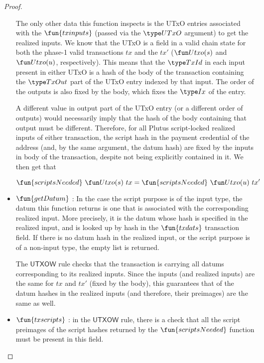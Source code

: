 \begin{property}
\begin{proof}
\begin{itemize}
      The only other data this function inspects is the UTxO entries associated
      with the $\fun{txinputs}$ (passed via the $\UTxO$ argument) to get the realized inputs.
      We know that the UTxO is a field in a valid chain state for both the phase-1 valid
      transactions $tx$ and
      the $tx'$ ($\Utxo(s)$ and $\Utxo(u)$, respectively). This means that the $\TxId$
      in each input present in either UTxO is a hash of the body of the transaction
      containing the $\TxOut$ part of the UTxO entry indexed by that input. The
      order of the outputs is also fixed by the body, which fixes the $\Ix$ of
      the entry.

      A different value in output part of the UTxO entry (or a different order of
      outputs) would necessarily imply
      that the hash of the body containing that output must be different.
      Therefore, for all Plutus script-locked realized inputs of either transaction,
      the script hash in the payment credential of the address
      (and, by the same argument, the datum hash) are fixed by the inputs in body of the
      transaction, despite not being explicitly contained in it. We then get that

      \[ \fun{scriptsNeeded}~\Utxo(s)~tx = \fun{scriptsNeeded}~\Utxo(u)~tx' \]

      \item $\fun{getDatum}$ : In the case the script purpose
      is of the input type, the datum this function returns is one that
      is associated with the corresponding realized input. More precisely, it is the datum whose
      hash is specified in the realized input, and is looked up by hash in the $\fun{txdats}$
      transaction field. If there is no datum hash in the realized input, or the script purpose
      is of a non-input type, the empty list is returned.

      The $\mathsf{UTXOW}$ rule checks that the transaction is carrying all datums corresponding
      to its realized inputs. Since the inputs (and realized inputs) are the same
      for $tx$ and $tx'$ (fixed by the body), this guarantees that
      of the datum hashes in the realized inputs (and therefore, their preimages)
      are the same as well.

      \item $\fun{txscripts}$ : in the $\mathsf{UTXOW}$ rule, there is a check that all the
      script preimages of the script hashes returned by the $\fun{scriptsNeeded}$
      function must be present in this field.


\end{itemize}
\end{proof}
\end{property}
